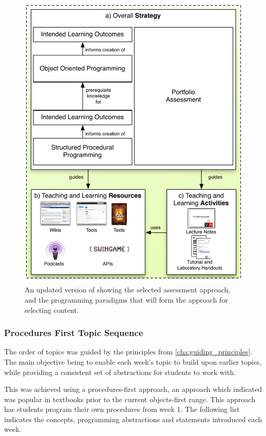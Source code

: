 \begin{figure}[p]
	\centering
	\includegraphics[width=\textwidth]{OverallStrategy}
	\caption{An updated version of  showing the selected assessment approach, and the programming paradigms that will form the approach for selecting content.}
	\label{fig:overall_strategy}
\end{figure}


\subsubsection{Procedures First Topic Sequence} %
\label{ssub:procedures_first_topic_sequence}

The order of topics was guided by the principles from \cref{cha:guiding_principles}. The main objective being to enable each week's topic to build upon earlier topics, while providing a consistent set of abstractions for students to work with.

This was achieved using a procedures-first approach, an approach which \citet{Pattis:1990} indicated was popular in textbooks prior to the current objects-first range. This approach has students program their own procedures from week 1. The following list indicates the concepts, programming abstractions and statements introduced each week.

